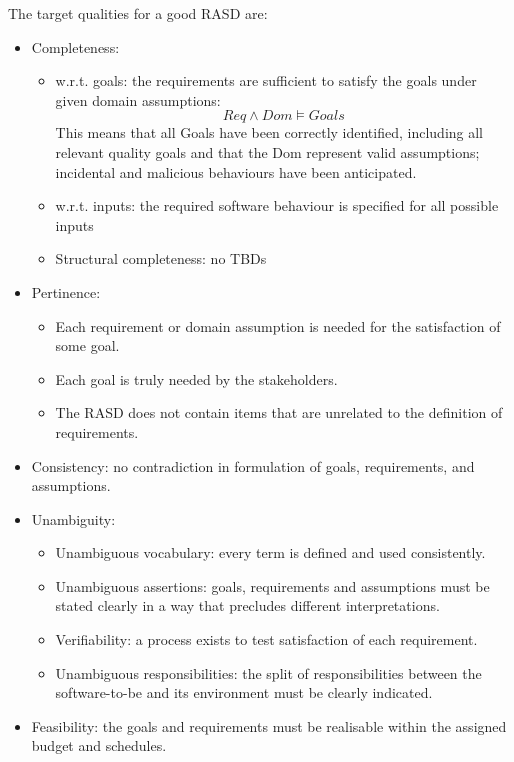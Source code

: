 \documentclass[12pt, a4paper]{report}
\theoremstyle{remark}
\begin{document}
    \par
    The target qualities for a good RASD are: 
    \begin{itemize}
        \item Completeness:
        \begin{itemize}
            \item w.r.t. goals: the requirements are sufficient to satisfy the goals under given domain assumptions: 
            \[Req \land Dom \models Goals\]
            This means that all Goals have been correctly identified, including all relevant quality goals and that the Dom represent valid assumptions; incidental and malicious behaviours have been anticipated. 
            \item w.r.t. inputs: the required software behaviour is specified for all possible inputs
            \item Structural completeness: no TBDs
        \end{itemize}
        \item Pertinence: 
        \begin{itemize}
            \item Each requirement or domain assumption is needed for the satisfaction of some goal. 
            \item Each goal is truly needed by the stakeholders. 
            \item The RASD does not contain items that are unrelated to the definition of requirements.
        \end{itemize}
        \item Consistency: no contradiction in formulation of goals, requirements, and assumptions. 
        \item Unambiguity: 
        \begin{itemize}
            \item Unambiguous vocabulary: every term is defined and used consistently.
            \item Unambiguous assertions: goals, requirements and assumptions must be stated clearly in a way that precludes different interpretations.
            \item Verifiability: a process exists to test satisfaction of each requirement.
            \item Unambiguous responsibilities: the split of responsibilities between the software-to-be and its environment must be clearly indicated. 
        \end{itemize}
        \item Feasibility: the goals and requirements must be realisable within the assigned budget and schedules. 

\end{itemize}
\end{document}
